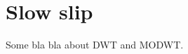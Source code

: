 \documentclass[main.tex]{subfiles}
\begin{document}
\part{Slow slip}

Some bla bla about DWT and MODWT.
\end{document}

